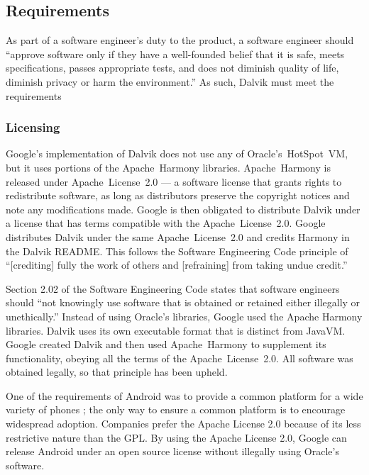 \documentclass[11pt]{article}
\begin{document}
\begin{multicols}{2}

\subsection{Requirements} %
\label{sub:requirements}

As part of a software engineer's duty to the product, a software engineer should
``approve software only if they have a well-founded belief that it is safe,
meets specifications, passes appropriate tests, and does not diminish quality of
life, diminish privacy or harm the environment.'' \cite[\S~1.03]{secode}  As
such, Dalvik must meet the requirements

\subsubsection{Licensing} %
\label{sub:licensing}

Google's implementation of Dalvik does not use any of Oracle's~HotSpot~VM, but
it uses portions of the Apache~Harmony libraries.  Apache~Harmony is released
under Apache~License~2.0 --- a software license that grants rights to
redistribute software, as long as distributors preserve the copyright notices
and note any modifications made.  \cite{apache-license} Google is then obligated
to distribute Dalvik under a license that has terms compatible with the
Apache~License~2.0.  Google distributes Dalvik under the same Apache~License~2.0
and credits Harmony in the Dalvik README.  \cite{dalvik-readme}  This follows
the Software Engineering Code principle of ``[crediting] fully the work of
others and [refraining] from taking undue credit.'' \cite[\S 7.03]{secode}

Section 2.02 of the Software Engineering Code states that software engineers
should ``not knowingly use software that is obtained or retained either
illegally or unethically.'' \cite[\S 2.02]{secode}  Instead of using Oracle's
libraries, Google used the Apache Harmony libraries.  Dalvik uses its own
executable format that is distinct from JavaVM.  Google created Dalvik and then
used Apache~Harmony to supplement its functionality, obeying all the terms of
the Apache~License~2.0.  All software was obtained legally, so that principle
has been upheld.

One of the requirements of Android was to provide a common platform for a wide
variety of phones \cite{open-handset-alliance-ann}; the only way to ensure a
common platform is to encourage widespread adoption.  Companies prefer the
Apache License 2.0 because of its less restrictive nature than the GPL.
\cite{why-apache2-license} By using the Apache License 2.0, Google can release
Android under an open source license without illegally using Oracle's software.


\end{multicols}
\end{document}
